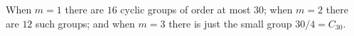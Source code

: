 \documentclass[a4paper,11pt]{article}
\theoremstyle{plain}
\theoremstyle{definition}
\begin{document}
\noindent 
When $m=1$ there are $16$ cyclic groups of order at most $30$; 
when $m=2$ there are $12$ such groups; 
and when $m=3$ there is just the small group $30/4 = C_{30}$. 

%
%

\end{document}
